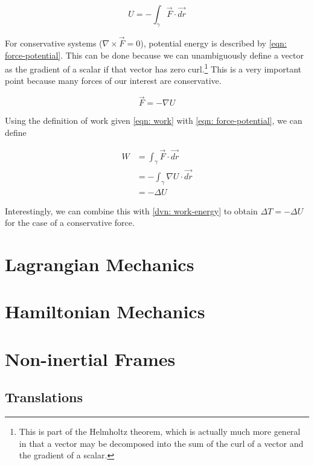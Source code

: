 \documentclass[main.tex]{subfiles}
\begin{document}
\begin{equation}
\label{eqn: pe-def}
U = - \int_{\gamma} \vec{F} \cdot \vec{dr}
\end{equation}


For conservative systems ($\nabla \times \vec{F} = 0$), potential energy is described by
\cref{eqn: force-potential}. This can be done because we can unambiguously define a vector
as the gradient of a scalar if that vector has zero curl.\footnote{This is part of the Helmholtz
theorem, which is actually much more general in that a vector may be decomposed into the
sum of the curl of a vector and the gradient of a scalar.} This is a very important point because
many forces of our interest are conservative.

\begin{equation}
\label{eqn: force-potential}
\vec{F} = - \nabla U
\end{equation}

Using the definition of work given \cref{eqn: work} with \cref{eqn: force-potential}, we
can define

\begin{align*}
W &= \int_{\gamma} \vec{F} \cdot \vec{dr} \\
&= - \int_{\gamma} \nabla U \cdot \vec{dr} \\
&= - \Delta U
\end{align*}

Interestingly, we can combine this with \cref{dvn: work-energy} to obtain
$\Delta T = -\Delta U$ for the case of a conservative force.

\chapter{Lagrangian Mechanics} \label{ch: lagrangian-mechanics}

\chapter{Hamiltonian Mechanics} \label{ch: hamiltonian-mechanics}

\chapter{Non-inertial Frames}

\section{Translations}
\end{document}
